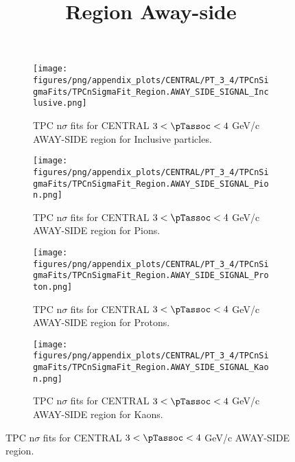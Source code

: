             \begin{figure}[H]
                \title{Region Away-side}
                \begin{subfigure}[b]{0.5\textwidth}
                    \centering
                    \texttt{[image: figures/png/appendix\_plots/CENTRAL/PT\_3\_4/TPCnSigmaFits/TPCnSigmaFit\_Region.AWAY\_SIDE\_SIGNAL\_Inclusive.png]}
                    \caption{TPC n$\sigma$ fits for CENTRAL $3 < \pTassoc < 4$ GeV/c AWAY-SIDE region for Inclusive particles.}
                    \label{fig:appendix_CENTRAL_$3 < \pTassoc < 4$ GeV/c_AWAY_SIDE_SIGNAL_Inclusive}
                \end{subfigure}
                \begin{subfigure}[b]{0.5\textwidth}
                    \centering
                    \texttt{[image: figures/png/appendix\_plots/CENTRAL/PT\_3\_4/TPCnSigmaFits/TPCnSigmaFit\_Region.AWAY\_SIDE\_SIGNAL\_Pion.png]}
                    \caption{TPC n$\sigma$ fits for CENTRAL $3 < \pTassoc < 4$ GeV/c AWAY-SIDE region for Pions.}
                    \label{fig:appendix_CENTRAL_$3 < \pTassoc < 4$ GeV/c_AWAY_SIDE_SIGNAL_Pion}
                \end{subfigure}
                \begin{subfigure}[b]{0.5\textwidth}
                    \centering
                    \texttt{[image: figures/png/appendix\_plots/CENTRAL/PT\_3\_4/TPCnSigmaFits/TPCnSigmaFit\_Region.AWAY\_SIDE\_SIGNAL\_Proton.png]}
                    \caption{TPC n$\sigma$ fits for CENTRAL $3 < \pTassoc < 4$ GeV/c AWAY-SIDE region for Protons.}
                    \label{fig:appendix_CENTRAL_$3 < \pTassoc < 4$ GeV/c_AWAY_SIDE_SIGNAL_Proton}
                \end{subfigure}
                \begin{subfigure}[b]{0.5\textwidth}
                    \centering
                    \texttt{[image: figures/png/appendix\_plots/CENTRAL/PT\_3\_4/TPCnSigmaFits/TPCnSigmaFit\_Region.AWAY\_SIDE\_SIGNAL\_Kaon.png]}
                    \caption{TPC n$\sigma$ fits for CENTRAL $3 < \pTassoc < 4$ GeV/c AWAY-SIDE region for Kaons.}
                    \label{fig:appendix_CENTRAL_$3 < \pTassoc < 4$ GeV/c_AWAY_SIDE_SIGNAL_Kaon}
                \end{subfigure}
                \caption{TPC n$\sigma$ fits for CENTRAL $3 < \pTassoc < 4$ GeV/c AWAY-SIDE region.}
                \label{fig:appendix_CENTRAL_$3 < \pTassoc < 4$ GeV/c_AWAY_SIDE_SIGNAL}
            \end{figure}
